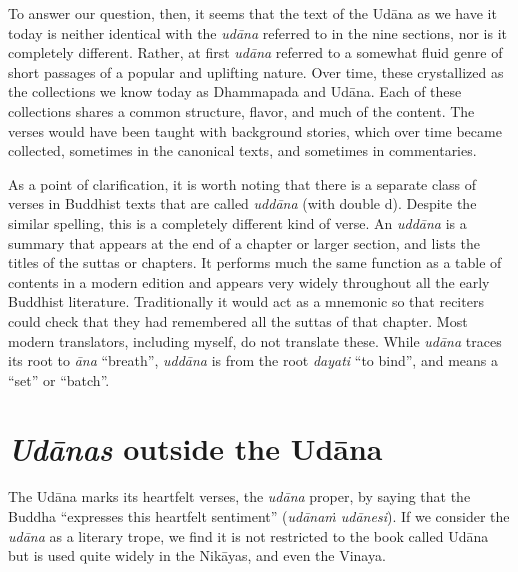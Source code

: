 \documentclass[12pt,openany]{book}%
\begin{document}
To answer our question, then, it seems that the text of the \textsanskrit{Udāna} as we have it today is neither identical with the \textit{\textsanskrit{udāna}} referred to in the nine sections, nor is it completely different. Rather, at first \textit{\textsanskrit{udāna}} referred to a somewhat fluid genre of short passages of a popular and uplifting nature. Over time, these crystallized as the collections we know today as Dhammapada and \textsanskrit{Udāna}. Each of these collections shares a common structure, flavor, and much of the content. The verses would have been taught with background stories, which over time became collected, sometimes in the canonical texts, and sometimes in commentaries.

As a point of clarification, it is worth noting that there is a separate class of verses in Buddhist texts that are called \textit{\textsanskrit{uddāna}} (with double d). Despite the similar spelling, this is a completely different kind of verse. An \textit{\textsanskrit{uddāna}} is a summary that appears at the end of a chapter or larger section, and lists the titles of the suttas or chapters. It performs much the same function as a table of contents in a modern edition and appears very widely throughout all the early Buddhist literature. Traditionally it would act as a mnemonic so that reciters could check that they had remembered all the suttas of that chapter. Most modern translators, including myself, do not translate these. While \textit{\textsanskrit{udāna}} traces its root to \textit{\textsanskrit{āna}} “breath”, \textit{\textsanskrit{uddāna}} is from the root \textit{dayati} “to bind”, and means a “set” or “batch”. 

\section*{\textit{\textsanskrit{Udānas}} outside the \textsanskrit{Udāna}}

The \textsanskrit{Udāna} marks its heartfelt verses, the \textit{\textsanskrit{udāna}} proper, by saying that the Buddha “expresses this heartfelt sentiment” (\textit{\textsanskrit{udānaṁ} \textsanskrit{udānesi}}). If we consider the \textit{\textsanskrit{udāna}} as a literary trope, we find it is not restricted to the book called \textsanskrit{Udāna} but is used quite widely in the \textsanskrit{Nikāyas}, and even the Vinaya. 
\end{document}

